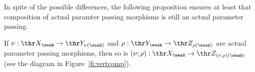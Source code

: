 In spite of the possible differences, the following proposition ensures at
least that
composition of actual paramter passing morphisms is still an actual parameter passing.
\begin{proposition}\label{prop:vertcomp}
If 
$\nu:\thr X_\weak\to \thr Y_{\nu(\weak)}$ and $\rho:\thr Y_\weak\to \thr Z_{\rho(\weak)}$
 are actual parameter passing
morphisms, then so is $(\nu;\rho):\thr X_\weak \to \thr Z_{(\nu;\rho)(\weak)}$
(see the diagram in Figure~\ref{fi:vertcomp}). 
\end{proposition}

